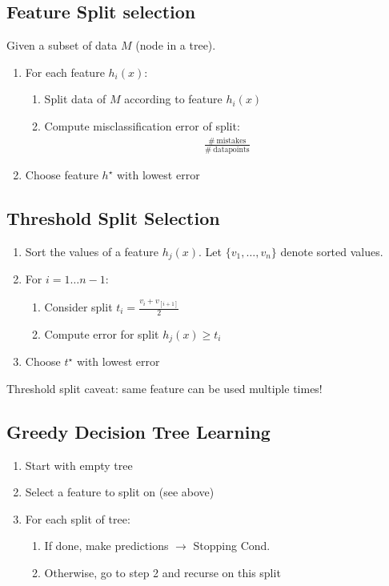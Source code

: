 \documentclass[8pt, a4paper, landscape, includeheadfoot]{extarticle}
\begin{document}
\begin{multicols*}{4}
	\subsection{Feature Split selection}
	Given a subset of data $M$ (node in a tree).
	\begin{enumerate}[itemsep=0pt]
		\item For each feature $h_i(x)$:
		      \begin{enumerate}
			      \item Split data of $M$ according to feature $h_i(x)$
			      \item Compute misclassification error of split:
			            \begin{align*}
				            \frac{\# \ \text{mistakes}}{\#\ \text{datapoints}}
			            \end{align*}
		      \end{enumerate}
		\item Choose feature $h^\star$ with lowest error
	\end{enumerate}

	\subsection{Threshold Split Selection}
	\begin{enumerate}[itemsep=0pt]
		\item Sort the values of a feature $h_j(x)$. Let $\{v_1, \dots, v_n\}$ denote sorted values.
		\item For $i = 1\dots n-1$:
		      \begin{enumerate}[itemsep=0pt]
			      \item Consider split $t_i = \frac{v_i + v_[i+1]}{2}$
			      \item Compute error for split $h_j(x)\geq t_i$
		      \end{enumerate}
		\item Choose $t^\star$ with lowest error
	\end{enumerate}
	Threshold split caveat: same feature can be used multiple times!

	\subsection{Greedy Decision Tree Learning}
	\begin{enumerate}[itemsep=0pt]
		\item Start with empty tree
		\item Select a feature to split on (see above)
		\item For each split of tree:
		      \begin{enumerate}[itemsep=0pt]
			      \item If done, make predictions $\rightarrow$ Stopping Cond.
			      \item Otherwise, go to step 2 and recurse on this split
		      \end{enumerate}
	\end{enumerate}


\end{multicols*}
\end{document}
